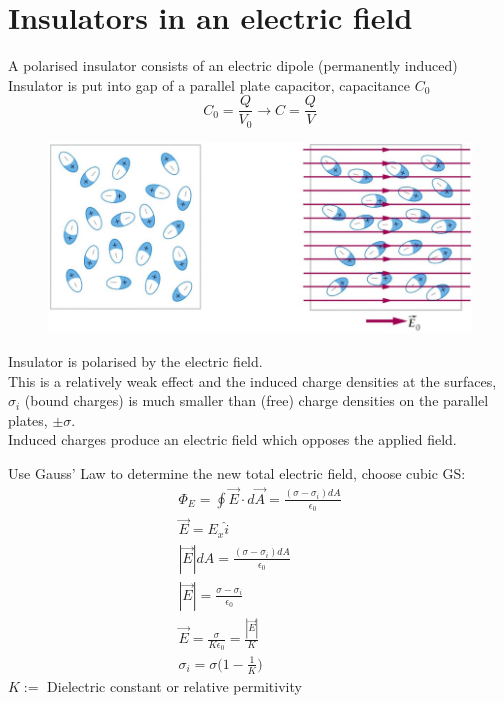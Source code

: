 \documentclass[a4paper, 11pt, fleqn, normalem]{report}
\begin{document}
\section{Insulators in an electric field}
A polarised insulator consists of an electric dipole (permanently induced) \\
Insulator is put into gap of a parallel plate capacitor, capacitance $C_{0}$
\begin{equation*}
    C_{0} = \frac{Q}{V_{0}} \to C = \frac{Q}{V}
\end{equation*}
\begin{figure}[H]
    \includegraphics[scale=0.4]{Diploes.png}
\end{figure}
Insulator is polarised by the electric field. \\
This is a relatively weak effect and the induced charge densities at the surfaces, $\sigma_{i}$ (bound charges) is much smaller than (free) charge densities on the parallel plates, $\pm \sigma$. \\
Induced charges produce an electric field which opposes the applied field.

Use Gauss' Law to determine the new total electric field, choose cubic GS:
\begin{gather*}
    \Phi_{E} = \oint \vec{E} \cdot d\vec{A} = \frac{(\sigma - \sigma_{i})dA}{\epsilon_{0}} \\
    \vec{E} = E_{x} \hat{i} \\
    |\vec{E}| dA = \frac{(\sigma - \sigma_{i})dA}{\epsilon_{0}} \\
    |\vec{E}| = \frac{\sigma - \sigma_{i}}{\epsilon_{0}} \\
    \vec{E} = \frac{\sigma}{K \epsilon_{0}} = \frac{|\vec{E}|}{K} \\
    \sigma_{i} = \sigma \Big(1 - \frac{1}{K} \Big)
\end{gather*}
$K :=$ Dielectric constant or relative permitivity
\end{document}
